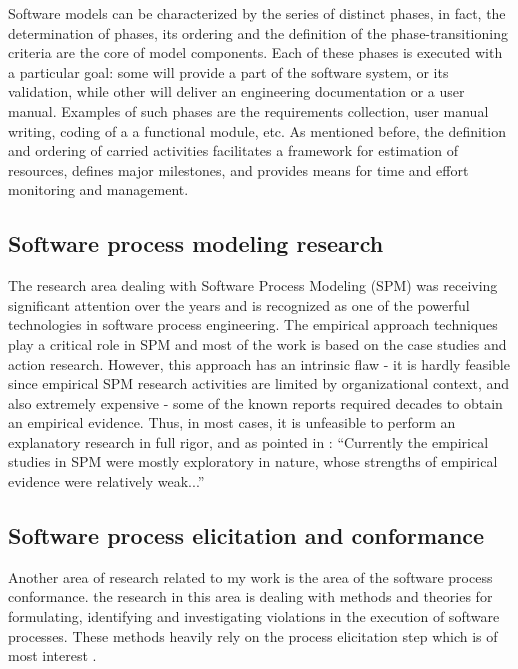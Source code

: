 Software models can be characterized by the series of distinct phases, in fact, the 
determination of phases, its ordering and the definition of the phase-transitioning 
criteria are the core of model components.
Each of these phases is executed with a particular goal: some will provide a part of the 
software system, or its validation, while other will deliver an engineering documentation 
or a user manual. Examples of such phases are the requirements collection, 
user manual writing, coding of a a functional module, etc.
As mentioned before, the definition and ordering of carried activities facilitates
a framework for estimation of resources, defines major milestones, and provides 
means for time and effort monitoring and management. 

\subsection{Software process modeling research}
The research area dealing with Software Process Modeling (SPM) was receiving significant 
attention over the years and is recognized as one of the powerful technologies
in software process engineering. The empirical approach techniques play a critical role
in SPM and most of the work is based on the case studies and action research. 
However, this approach has an intrinsic flaw - it is hardly feasible since
empirical SPM research activities are limited by organizational context, and also extremely 
expensive - some of the known reports required decades to obtain an empirical evidence.
Thus, in most cases, it is unfeasible to perform an explanatory research in full rigor,
and as pointed in \cite{citeulike:11079867}: ``Currently the empirical studies in SPM were 
mostly exploratory in nature, whose strengths of empirical evidence were relatively weak...''

\subsection{Software process elicitation and conformance}
Another area of research related to my work is the area of the software process conformance. 
the research in this area is dealing with methods and theories for formulating, identifying and
investigating violations in the execution of software processes. These methods heavily rely
on the process elicitation step which is of most interest . 

